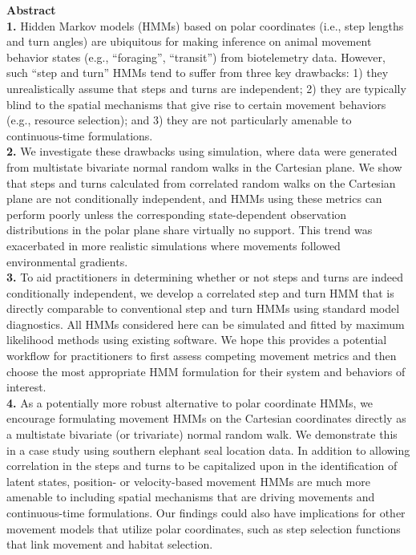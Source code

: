 \documentclass[12pt]{article}\usepackage[]{graphicx}\usepackage[]{xcolor}
\begin{document}
\noindent \textbf{Abstract}\\
\textbf{1.} Hidden Markov models (HMMs) based on polar coordinates (i.e., step lengths and turn angles) are ubiquitous for making inference on animal movement behavior states (e.g., ``foraging'', ``transit'') from biotelemetry data. However, such ``step and turn'' HMMs tend to suffer from three key drawbacks: 1) they unrealistically assume that steps and turns are independent; 2) they are typically blind to the spatial mechanisms that give rise to certain movement behaviors (e.g., resource selection); and 3) they are not particularly amenable to continuous-time formulations.\\
\textbf{2.} We investigate these drawbacks using simulation, where data were generated from multistate bivariate normal random walks in the Cartesian plane. We show that steps and turns calculated from correlated random walks on the Cartesian plane are not conditionally independent, and HMMs using these metrics can perform poorly unless the corresponding state-dependent observation distributions in the polar plane share virtually no support. This trend was exacerbated in more realistic simulations where movements followed environmental gradients.\\
\textbf{3.} To aid practitioners in determining whether or not steps and turns are indeed conditionally independent, we develop a correlated step and turn HMM that is directly comparable to conventional step and turn HMMs using standard model diagnostics. All HMMs considered here can be simulated and fitted by maximum likelihood methods using existing software. We hope this provides a potential workflow for practitioners to first assess competing movement metrics and then choose the most appropriate HMM formulation for their system and behaviors of interest.\\
\textbf{4.} As a potentially more robust alternative to polar coordinate HMMs, we encourage formulating movement HMMs on the Cartesian coordinates directly as a multistate bivariate (or trivariate) normal random walk. We demonstrate this in a case study using southern elephant seal location data. In addition to allowing correlation in the steps and turns to be capitalized upon in the identification of latent states, position- or velocity-based movement HMMs are much more amenable to including spatial mechanisms that are driving movements and continuous-time formulations. Our findings could also have implications for other movement models that utilize polar coordinates, such as step selection functions that link movement and habitat selection.\\
\end{document}
